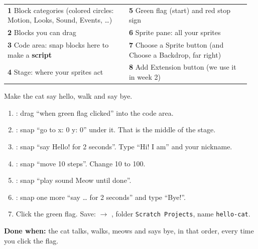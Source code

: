 \begin{tabular}{@{}p{0.48\linewidth}p{0.48\linewidth}@{}}
\textbf{1} Block categories (colored circles: Motion, Looks, Sound, Events, \ldots) & \textbf{5} Green flag (start) and red stop sign \\
\textbf{2} Blocks you can drag & \textbf{6} Sprite pane: all your sprites \\
\textbf{3} Code area: snap blocks here to make a \textbf{script} & \textbf{7} Choose a Sprite button (and Choose a Backdrop, far right) \\
\textbf{4} Stage: where your sprites act & \textbf{8} Add Extension button (we use it in week 2) \\
\end{tabular}

\begin{exercise}
Make the cat say hello, walk and say bye.
\begin{enumerate}[leftmargin=1.4em,itemsep=1pt]
  \item {}: drag \enquote{when green flag clicked} into the code area.
  \item {}: snap \enquote{go to x: 0 y: 0} under it. That is the middle of the stage.
  \item {}: snap \enquote{say Hello! for 2 seconds}. Type \enquote{Hi! I am} and your nickname.
  \item {}: snap \enquote{move 10 steps}. Change 10 to 100.
  \item {}: snap \enquote{play sound Meow until done}.
  \item {}: snap one more \enquote{say \ldots{} for 2 seconds} and type \enquote{Bye!}.
  \item Click the green flag. Save:  $\rightarrow$ , folder \texttt{Scratch Projects}, name \texttt{hello-cat}.
\end{enumerate}
\begin{center}
\begin{scratch}[scale=0.85]
\end{scratch}
\end{center}
\textbf{Done when:} the cat talks, walks, meows and says bye, in that order, every time you click the flag.
\end{exercise}

